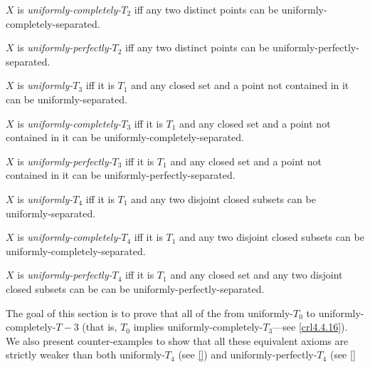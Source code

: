 \begin{dfn}\label{UniformlyCompletelyT2}
$X$ is \emph{uniformly-completely-$T_2$} iff any two distinct points can be uniformly-completely-separated.
\end{dfn}
\begin{dfn}\label{UniformlyPerfectlyT2}
$X$ is \emph{uniformly-perfectly-$T_2$} iff any two distinct points can be uniformly-perfectly-separated.
\end{dfn}
\begin{dfn}[Uniformly-$T_3$]\label{UniformlyT3}
$X$ is \emph{uniformly-$T_3$} iff it is $T_1$ and any closed set and a point not contained in it can be uniformly-separated.
\end{dfn}
\begin{dfn}\label{UniformlyCompletelyT3}
$X$ is \emph{uniformly-completely-$T_3$} iff it is $T_1$ and any closed set and a point not contained in it can be uniformly-completely-separated.
\end{dfn}
\begin{dfn}\label{UniformlyPerfectlyT3}
$X$ is \emph{uniformly-perfectly-$T_3$} iff it is $T_1$ and any closed set and a point not contained in it can be uniformly-perfectly-separated.
\end{dfn}
\begin{dfn}[Uniformly-$T_4$]\label{UniformlyT4}
$X$ is \emph{uniformly-$T_4$} iff it is $T_1$ and any two disjoint closed subsets can be uniformly-separated.
\end{dfn}
\begin{dfn}\label{UniformlyCompletelyT4}
$X$ is \emph{uniformly-completely-$T_4$} iff it is $T_1$ and any two disjoint closed subsets can be uniformly-completely-separated.
\end{dfn}
\begin{dfn}\label{UniformlyPerfectlyT4}
$X$ is \emph{uniformly-perfectly-$T_4$} iff it is $T_1$ and any closed set and any two disjoint closed subsets can be can be uniformly-perfectly-separated.
\end{dfn}
The goal of this section is to prove that all of the from uniformly-$T_0$ to uniformly-completely-$T-3$ (that is, $T_0$ implies uniformly-completely-$T_3$---see \cref{crl4.4.16}).  We also present counter-examples to show that all these equivalent axioms are strictly weaker than both uniformly-$T_4$ (see \cref{}) and uniformly-perfectly-$T_4$ (see \cref{}

